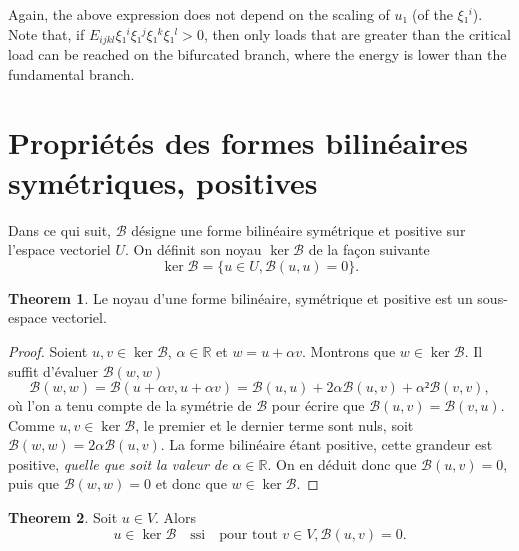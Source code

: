 \documentclass[12pt, final]{scrartcl}
\theoremstyle{definition}
\newtheorem{theorem}{Theorem}
\newcommand{\reals}{\mathbb{R}}
\begin{document}
Again, the above expression does not depend on the scaling of \(u₁\) (of the
\(ξ₁^i\)). Note that, if \(E_{ijkl} ξ₁^i ξ₁^j ξ₁^k ξ₁^l > 0\), then only loads
that are greater than the critical load can be reached on the bifurcated branch,
where the energy is lower than the fundamental branch.

\section{Propriétés des formes bilinéaires symétriques, positives}

Dans ce qui suit, \(\mathcal{B}\) désigne une forme bilinéaire symétrique et
positive sur l'espace vectoriel \(U\). On définit son noyau \(\ker \mathcal{B}\)
de la façon suivante
\begin{equation}
 \ker \mathcal{B}= \bigl\{ u ∈ U, \mathcal{B}(u, u) = 0 \bigr\} .
\end{equation}

\begin{theorem}
  Le noyau d'une forme bilinéaire, symétrique et positive est un sous-espace
  vectoriel.
\end{theorem}
\begin{proof}
  Soient \(u, v∈\ker \mathcal{B}\), \(α∈\reals\) et \(w = u + α v\). Montrons
  que \(w ∈ \ker\mathcal{B}\). Il suffit d'évaluer \(\mathcal{B}(w, w)\)
 \begin{equation}
   \mathcal{B}(w, w) = \mathcal{B}(u + α v, u + α v)
   = \mathcal{B}(u, u) + 2 α \mathcal{B}(u, v) + α² \mathcal{B}(v, v),
 \end{equation}
 où l'on a tenu compte de la symétrie de \(\mathcal{B}\) pour écrire que
 \(\mathcal{B}(u, v) =\mathcal{B}(v, u)\). Comme \(u, v ∈ \ker\mathcal{B}\), le
 premier et le dernier terme sont nuls, soit
 \(\mathcal{B}(w, w) = 2α \mathcal{B}(u, v)\). La forme bilinéaire étant
 positive, cette grandeur est positive, \emph{quelle que soit la valeur de
   \(α∈\reals\)}. On en déduit donc que \(\mathcal{B}(u, v) = 0\), puis que
 \(\mathcal{B}(w, w) = 0\) et donc que \(w ∈ \ker\mathcal{B}\).
\end{proof}

\begin{theorem}
 Soit \(u∈V\). Alors
 \begin{equation}
  u ∈ \ker\mathcal{B} \quad \text{ssi} \quad \text{pour tout } v ∈ V, \mathcal{B}(u, v) = 0.
 \end{equation}
\end{theorem}
\end{document}
